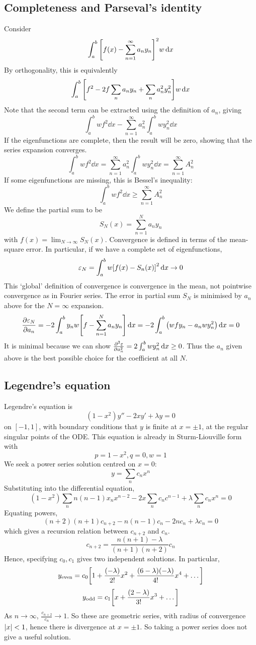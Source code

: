 \subsection{Completeness and Parseval's identity}
Consider
\[
	\int_a^b \qty[ f(x) - \sum_{n=1}^\infty a_n y_n ]^2 w \dd{x}
\]
By orthogonality, this is equivalently
\[
	\int_a^b \qty[ f^2 - 2 f \sum_n a_n y_n + \sum_n a_n^2 y_n^2 ] w \dd{x}
\]
Note that the second term can be extracted using the definition of \( a_n \), giving
\[
	\int_a^b wf^2 \dd{x} - \sum_{n=1}^\infty a_n^2 \int_a^b w y_n^2 \dd{x}
\]
If the eigenfunctions are complete, then the result will be zero, showing that the series expansion converges.
\[
	\int_a^b w f^2 \dd{x} = \sum_{n=1}^\infty a_n^2 \int_a^b w y_n^2 \dd{x} = \sum_{n=1}^\infty A_n^2
\]
If some eigenfunctions are missing, this is Bessel's inequality:
\[
	\int_a^b w f^2 \dd{x} \geq \sum_{n=1}^\infty A_n^2
\]
We define the partial sum to be
\[
	S_N(x) = \sum_{n=1}^N a_n y_n
\]
with \( f(x) = \lim_{N \to \infty} S_N(x) \).
Convergence is defined in terms of the mean-square error.
In particular, if we have a complete set of eigenfunctions,
\[
	\varepsilon_N = \int_a^b w \qty[f(x) - S_n(x)]^2 \dd{x} \to 0
\]
This `global' definition of convergence is convergence in the mean, not pointwise convergence as in Fourier series.
The error in partial sum \( S_N \) is minimised by \( a_n \) above for the \( N = \infty \) expansion.
\[
	\pdv{\varepsilon_N}{a_n} = -2 \int_a^b y_n w \qty[ f - \sum_{n=1}^N a_n y_n ] \dd{x} = -2 \int_a^b \qty(wfy_n - a_n w y_n^2) \dd{x} = 0
\]
It is minimal because we can show \( \pdv[2]{\varepsilon}{a_n} = 2 \int_a^b w y_n^2 \dd{x} \geq 0 \).
Thus the \( a_n \) given above is the best possible choice for the coefficient at all \( N \).

\subsection{Legendre's equation}
Legendre's equation is
\[
	(1-x^2)y'' - 2xy' + \lambda y = 0
\]
on \( [-1,1] \), with boundary conditions that \( y \) is finite at \( x = \pm 1 \), at the regular singular points of the ODE.\@
This equation is already in Sturm-Liouville form with
\[
	p=1-x^2, q=0, w=1
\]
We seek a power series solution centred on \( x = 0 \):
\[
	y = \sum_n c_n x^n
\]
Substituting into the differential equation,
\[
	(1-x^2) \sum_n n(n-1) x_n x^{n-2} - 2x \sum_n c_n c^{n-1} + \lambda \sum_n c_n x^n = 0
\]
Equating powers,
\[
	(n+2)(n+1)c_{n+2} - n(n-1)c_n - 2n c_n + \lambda c_n = 0
\]
which gives a recursion relation between \( c_{n+2} \) and \( c_n \).
\[
	c_{n+2} = \frac{n(n+1) - \lambda}{(n+1)(n+2)} c_n
\]
Hence, specifying \( c_0, c_1 \) gives two independent solutions.
In particular,
\[
	y_{\text{even}} = c_0 \qty[1 + \frac{(-\lambda)}{2!}x^2 + \frac{(6-\lambda)(-\lambda)}{4!} x^4 + \dots]
\]
\[
	y_{\text{odd}} = c_1 \qty[x + \frac{(2-\lambda)}{3!}x^3 + \dots]
\]
As \( n \to \infty \), \( \frac{c_{n+2}}{c_n} \to 1 \).
So these are geometric series, with radius of convergence \( \abs{x} < 1 \), hence there is divergence at \( x = \pm 1 \).
So taking a power series does not give a useful solution.

